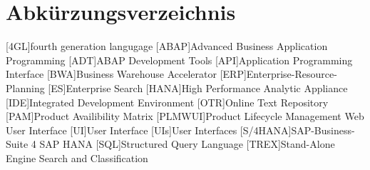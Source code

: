 \clearpage
\chapter*{Abkürzungsverzeichnis}	

\begin{acronym}[XXXXXXX]
	[4GL]{fourth generation langugage}
	[ABAP]{Advanced Business Application Programming}
	[ADT]{ABAP Development Tools}
	[API]{Application Programming Interface}
	[BWA]{Business Warehouse Accelerator}
	[ERP]{Enterprise-Resource-Planning}
	[ES]{Enterprise Search}
	[HANA]{High Performance Analytic Appliance}
	[IDE]{Integrated Development Environment}
	[OTR]{Online Text Repository}
	[PAM]{Product Availibility Matrix}
	[PLMWUI]{Product Lifecycle Management Web User Interface}
	[UI]{User Interface}
	[UIs]{User Interfaces}
	[S/4HANA]{SAP-Business-Suite 4 SAP HANA}
	[SQL]{Structured Query Language}
	[TREX]{Stand-Alone Engine Search and Classification}
\end{acronym}